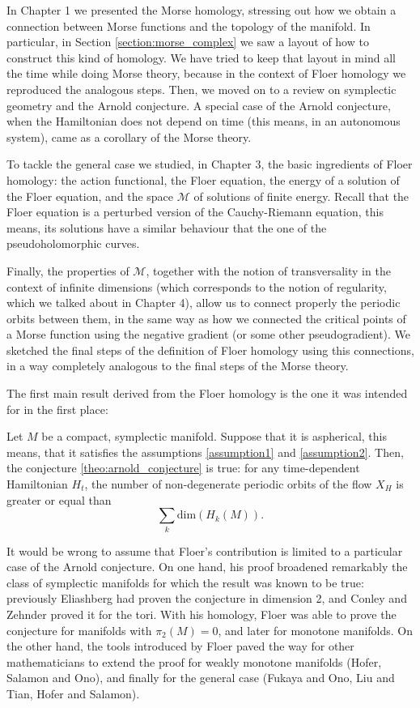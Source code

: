 In Chapter 1 we presented the Morse homology, stressing out how we obtain a connection between Morse functions and the topology of the manifold. In particular, in Section \ref{section:morse_complex} we saw a layout of how to construct this kind of homology. We have tried to keep that layout in mind all the time while doing Morse theory, because in the context of Floer homology we reproduced the analogous steps. Then, we moved on to a review on symplectic geometry and the Arnold conjecture. A special case of the Arnold conjecture, when the Hamiltonian does not depend on time (this means, in an autonomous system), came as a corollary of the Morse theory.

To tackle the general case we studied, in Chapter 3, the basic ingredients of Floer homology: the action functional, the Floer equation, the energy of a solution of the Floer equation, and the space $\mathcal{M}$ of solutions of finite energy. Recall that the Floer equation is a perturbed version of the Cauchy-Riemann equation, this means, its solutions have a similar behaviour that the one of the pseudoholomorphic curves.

Finally, the properties of $\mathcal{M}$, together with the notion of transversality in the context of infinite dimensions (which corresponds to the notion of regularity, which we talked about in Chapter 4), allow us to connect properly the periodic orbits between them, in the same way as how we connected the critical points of a Morse function using the negative gradient (or some other pseudogradient). We sketched the final steps of the definition of Floer homology using this connections, in a way completely analogous to the final steps of the Morse theory.

The first main result derived from the Floer homology is the one it was intended for in the first place:

\begin{rmrk}
Let $M$ be a compact, symplectic manifold. Suppose that it is aspherical, this means, that it satisfies the assumptions \ref{assumption1} and \ref{assumption2}. Then, the conjecture \ref{theo:arnold_conjecture} is true: for any time-dependent Hamiltonian $H_t$, the number of non-degenerate periodic orbits of the flow $X_H$ is greater or equal than
\[\sum_k \mathrm{dim}(H_k(M)) .\]
\end{rmrk}

It would be wrong to assume that Floer's contribution is limited to a particular case of the Arnold conjecture. On one hand, his proof broadened remarkably the class of symplectic manifolds for which the result was known to be true: previously Eliashberg had proven the conjecture in dimension 2, and Conley and Zehnder proved it for the tori. With his homology, Floer was able to prove the conjecture for manifolds with $\pi_2(M) = 0$, and later for monotone manifolds. On the other hand, the tools introduced by Floer paved the way for other mathematicians to extend the proof for weakly monotone manifolds (Hofer, Salamon and Ono), and finally for the general case (Fukaya and Ono, Liu and Tian, Hofer and Salamon).

